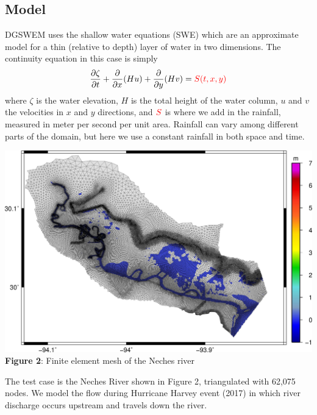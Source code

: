 \documentclass[american]{article}
\newcommand\pd[2]{\frac{\partial #1}{\partial #2}}
\begin{document}
\begin{multicols}{3}
\hrulefill

\section*{Model}
\noindent DGSWEM uses the shallow water equations (SWE) which are an approximate model for a thin (relative to depth) layer of water in two dimensions. The continuity equation in this case is simply
\begin{align*}
  \pd{\zeta}{t} + \pd{}{x} (Hu) + \pd{}{y} (Hv) = {\color{red} S(t,x,y)}
\end{align*}
where $\zeta$ is the water elevation, $H$ is the total height of the water column, $u$ and $v$ the velocities in $x$ and $y$ directions, and $\color{red} S$ is where we add in the rainfall, measured in meter per second per unit area. Rainfall can vary among different parts of the domain, but here we use a constant rainfall in both space and time.

\begin{center}
  \vspace{5mm}
  \includegraphics[width=0.95\linewidth]{media/grid.jpg}
  \textbf{Figure 2}: Finite element mesh of the Neches river
\end{center}

The test case is the Neches River shown in Figure 2, triangulated with 62,075 nodes. We model the flow during Hurricane Harvey event (2017) in which river discharge occurs upstream and travels down the river.

\hrulefill

\end{multicols}
\end{document}
